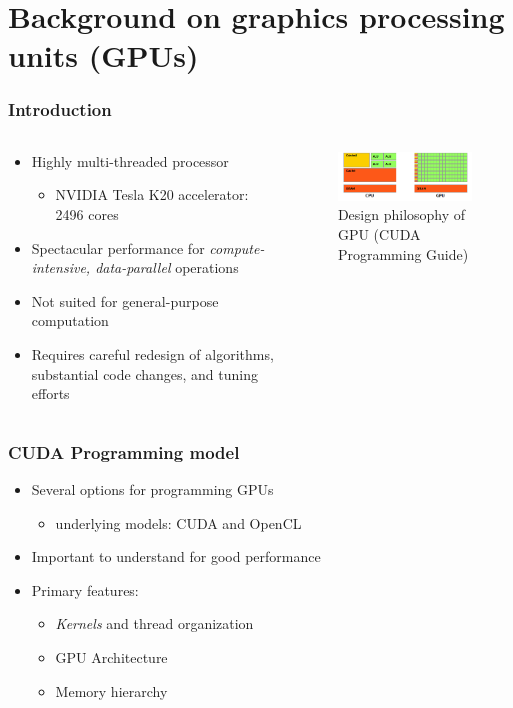 \section{Background on graphics processing units (GPUs)}

\begin{frame}[t]
\frametitle{Introduction}
\begin{columns}[T]
\begin{column}{0.5\textwidth}
\begin{itemize}
\item Highly multi-threaded processor
    \begin{itemize}
        \item NVIDIA Tesla K20 accelerator: 2496 cores
    \end{itemize}
\item Spectacular performance for
    \emph{compute-intensive, data-parallel} operations
\item Not suited for general-purpose computation
\item Requires careful redesign of algorithms,
    substantial code changes, and tuning efforts
\end{itemize}
\end{column}
\begin{column}{0.5\textwidth}
\begin{figure}
\begin{center}
\includegraphics[width=150px]{img/device-comparison.png}
\centering
\caption{Design philosophy of GPU (CUDA Programming Guide)}
\end{center}
\end{figure}
\end{column}
\end{columns}
\end{frame}

\begin{frame}
\frametitle{CUDA Programming model}
\begin{itemize}
\item Several options for programming GPUs
    \begin{itemize}[<+->]
        \item underlying models: CUDA and OpenCL
    \end{itemize}
\item Important to understand for good performance
\item Primary features:
    \begin{itemize}
        \item \emph{Kernels} and thread organization
        \item GPU Architecture
        \item Memory hierarchy
    \end{itemize}
\end{itemize}
\end{frame}

